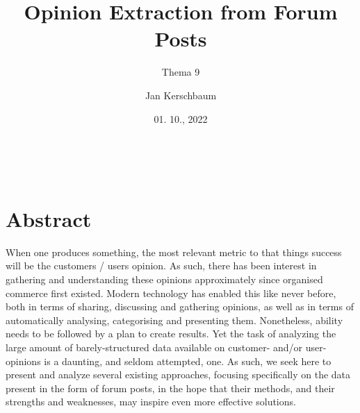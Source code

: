 \documentclass[a4paper,10pt, bibliography=totocnumbered]{scrreprt}
\author{Jan Kerschbaum}
\title{Opinion Extraction from Forum Posts}
\subtitle{Thema 9} %
\date{01. 10., 2022} %
\makeatletter
\renewcommand{\maketitle}{\begin{titlepage}
    \vskip 10\p@
    \hbox{
      \vrule depth 0.99\textheight
        \mbox{\hspace{2em}}
      \vtop{
        \vskip 10\p@
        \hspace{4pt}
        \vskip 50\p@
        \begin{flushleft}
          \Large \@author \par
        \end{flushleft}
        \vskip 50\p@
        \begin{flushleft}
          \huge \bfseries \@title \par
        \end{flushleft}
        \begin{flushleft}
          \Large \bfseries \@subtitle \par
        \end{flushleft}
        \vskip 70\p@
        \begin{flushleft}
          \Large \@publishers \par
        \end{flushleft}
        \vskip 50\p@
        \begin{flushleft}
          \Large \@date \par
        \end{flushleft}
        }}
  \end{titlepage}
}
\makeatother
\begin{document}
\maketitle

\section*{Abstract}
When one produces something, the most relevant metric to that things success will be the customers / users opinion. As such, there has been interest in gathering and understanding these opinions approximately since organised commerce first existed. Modern technology has enabled this like never before, both in terms of sharing, discussing and gathering opinions, as well as in terms of automatically analysing, categorising and presenting them. Nonetheless, ability needs to be followed by a plan to create results. Yet the task of analyzing the large amount of barely-structured data available on customer- and/or user-opinions is a daunting, and seldom attempted, one. As such, we seek here to present and analyze several existing approaches, focusing specifically on the data present in the form of forum posts, in the hope that their methods, and their strengths and weaknesses, may inspire even more effective solutions.

\tableofcontents
\end{document}
